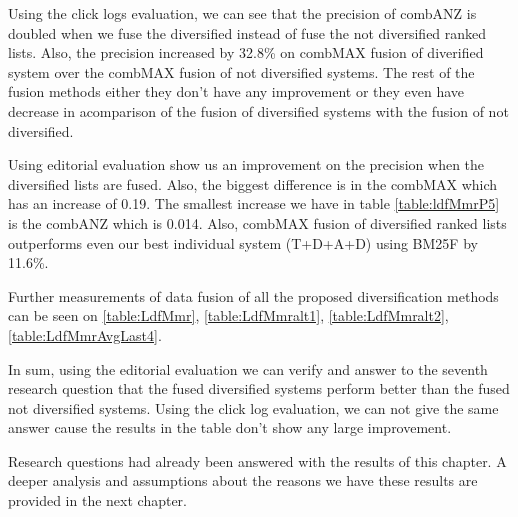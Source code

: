 Using the click logs evaluation, we can see that the precision of combANZ is doubled when we fuse the diversified instead of fuse the not diversified ranked lists. Also, the precision increased by 32.8\% on combMAX fusion of diverified system over the combMAX fusion of not diversified systems. The rest of the fusion methods either they don't have any improvement or they even have decrease  in acomparison of the fusion of diversified systems with the fusion of not diversified.

Using editorial evaluation show us an improvement on the precision when the diversified lists are fused. Also, the biggest difference is in the combMAX which has an increase of 0.19. The smallest increase we have in table \ref{table:ldfMmrP5} is the combANZ which is 0.014. Also, combMAX fusion of diversified ranked lists outperforms even our best individual system (T+D+A+D) using BM25F by 11.6\%. 

Further measurements of data fusion of all the proposed diversification methods can be seen on \ref{table:LdfMmr}, \ref{table:LdfMmralt1}, \ref{table:LdfMmralt2}, \ref{table:LdfMmrAvgLast4}.

In sum, using the editorial evaluation we can verify and answer to the seventh research question that the fused diversified systems perform better than the fused not diversified systems. Using the click log evaluation, we can not give the same answer cause the results in the table don't show any large improvement.


Research questions had already been answered with the results of this chapter. A deeper analysis and assumptions about the reasons we have these results are provided in the next chapter.
